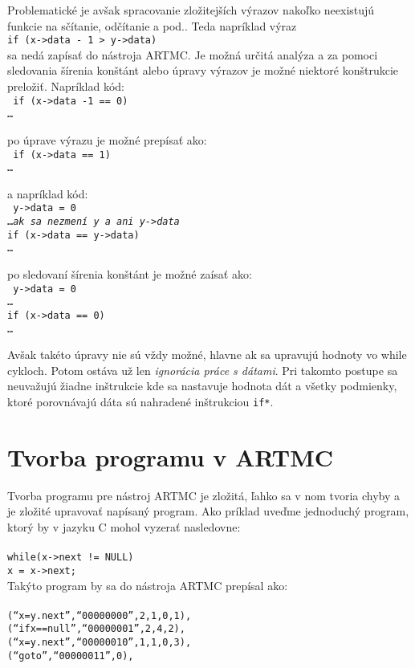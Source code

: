 Problematické je avšak spracovanie zložitejších výrazov nakoľko neexistujú funkcie na sčítanie, odčítanie a pod.. Teda napríklad výraz\\
\tab \texttt{if (x->data - 1 > y->data)}\\
sa nedá zapísať do nástroja ARTMC. Je možná určitá analýza a za pomoci sledovania šírenia konštánt alebo úpravy výrazov je možné niektoré konštrukcie preložiť. Napríklad kód:\\
\texttt{
if (x->data -1 == 0)\\
\tab \dots
}  

\noindent
po úprave výrazu je možné prepísať ako:\\
\texttt{
if (x->data == 1)\\
\tab \dots
}  

\noindent
a napríklad kód:\\
\texttt{
y->data = 0\\
\dots \textit{ak sa nezmení y a ani y->data}\\
if (x->data == y->data)\\
\tab \dots
}  

\noindent
po sledovaní šírenia konštánt je možné zaísať ako:\\
\texttt{
y->data = 0\\
\dots\\
if (x->data == 0)\\ 
\tab \dots
}  

Avšak takéto úpravy nie sú vždy možné, hlavne ak sa upravujú hodnoty vo while cykloch. Potom ostáva už len \textit{ignorácia práce s dátami}. Pri takomto postupe sa neuvažujú žiadne inštrukcie kde sa nastavuje hodnota dát a všetky podmienky, ktoré porovnávajú dáta sú nahradené inštrukciou \texttt{if*}.

\section{Tvorba programu v ARTMC}
Tvorba programu pre nástroj ARTMC je zložitá, ľahko sa v nom tvoria chyby a je zložité
upravovať napísaný program.
Ako príklad uveďme jednoduchý program, ktorý by v jazyku C mohol vyzerať nasledovne:\\
\noindent
\texttt{
\\
while(x->next != NULL)\\
\tab x = x->next;
\\
}
\noindent
Takýto program by sa do nástroja ARTMC prepísal ako:\\
\texttt{ 
\\
\tab (``x=y.next'',``00000000'',2,1,0,1),\\
\tab (``ifx==null'',``00000001'',2,4,2),\\
\tab (``x=y.next'',``00000010'',1,1,0,3),\\
\tab (``goto'',``00000011'',0),\\
}

